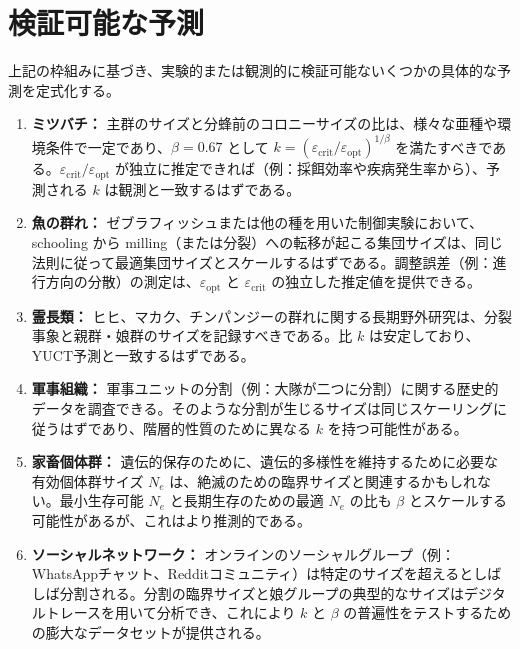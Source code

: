 \documentclass[12pt]{article}
\theoremstyle{remark}
\begin{document}
	\section{検証可能な予測}
	\label{sec:predictions}
	
	上記の枠組みに基づき、実験的または観測的に検証可能ないくつかの具体的な予測を定式化する。
	
	\begin{enumerate}
		\item \textbf{ミツバチ：} 主群のサイズと分蜂前のコロニーサイズの比は、様々な亜種や環境条件で一定であり、\(\beta = 0.67\) として \(k = (\varepsilon_{\text{crit}}/\varepsilon_{\text{opt}})^{1/\beta}\) を満たすべきである。\(\varepsilon_{\text{crit}}/\varepsilon_{\text{opt}}\) が独立に推定できれば（例：採餌効率や疾病発生率から）、予測される \(k\) は観測と一致するはずである。
		
		\item \textbf{魚の群れ：} ゼブラフィッシュまたは他の種を用いた制御実験において、schooling から milling（または分裂）への転移が起こる集団サイズは、同じ法則に従って最適集団サイズとスケールするはずである。調整誤差（例：進行方向の分散）の測定は、\(\varepsilon_{\text{opt}}\) と \(\varepsilon_{\text{crit}}\) の独立した推定値を提供できる。
		
		\item \textbf{霊長類：} ヒヒ、マカク、チンパンジーの群れに関する長期野外研究は、分裂事象と親群・娘群のサイズを記録すべきである。比 \(k\) は安定しており、YUCT予測と一致するはずである。
		
		\item \textbf{軍事組織：} 軍事ユニットの分割（例：大隊が二つに分割）に関する歴史的データを調査できる。そのような分割が生じるサイズは同じスケーリングに従うはずであり、階層的性質のために異なる \(k\) を持つ可能性がある。
		
		\item \textbf{家畜個体群：} 遺伝的保存のために、遺伝的多様性を維持するために必要な有効個体群サイズ \(N_e\) は、絶滅のための臨界サイズと関連するかもしれない。最小生存可能 \(N_e\) と長期生存のための最適 \(N_e\) の比も \(\beta\) とスケールする可能性があるが、これはより推測的である。
		
		\item \textbf{ソーシャルネットワーク：} オンラインのソーシャルグループ（例：WhatsAppチャット、Redditコミュニティ）は特定のサイズを超えるとしばしば分割される。分割の臨界サイズと娘グループの典型的なサイズはデジタルトレースを用いて分析でき、これにより \(k\) と \(\beta\) の普遍性をテストするための膨大なデータセットが提供される。
	\end{enumerate}
	
\end{document}
